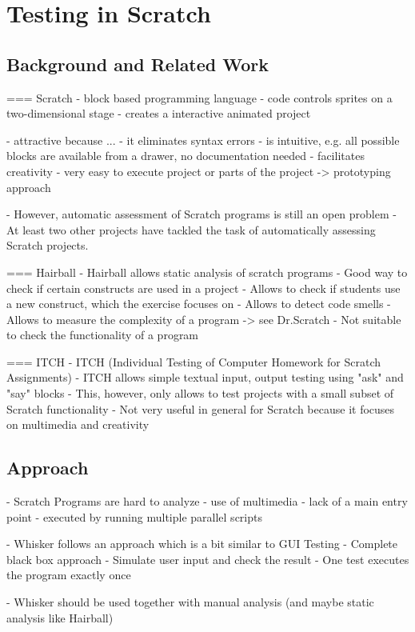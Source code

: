 \section{Testing in Scratch}

\subsection{Background and Related Work}

=== Scratch
- block based programming language
- code controls sprites on a two-dimensional stage
- creates a interactive animated project

- attractive because ...
    - it eliminates syntax errors
    - is intuitive, e.g. all possible blocks are available from a drawer, no documentation needed
    - facilitates creativity
    - very easy to execute project or parts of the project -> prototyping approach

- However, automatic assessment of Scratch programs is still an open problem
- At least two other projects have tackled the task of automatically assessing Scratch projects.

=== Hairball
- Hairball \cite{hairball} allows static analysis of scratch programs
- Good way to check if certain constructs are used in a project
    - Allows to check if students use a new construct, which the exercise focuses on
- Allows to detect code smells
- Allows to measure the complexity of a program -> see Dr.Scratch
- Not suitable to check the functionality of a program

=== ITCH
- ITCH (Individual Testing of Computer Homework for Scratch Assignments) \cite{itch}
- ITCH allows simple textual input, output testing using "ask" and "say" blocks
- This, however,  only allows to test projects with a small subset of Scratch functionality
- Not very useful in general for Scratch because it focuses on multimedia and creativity

\subsection{Approach}
- Scratch Programs are hard to analyze
    - use of multimedia
    - lack of a main entry point
    - executed by running multiple parallel scripts

- Whisker follows an approach which is a bit similar to GUI Testing
- Complete black box approach
- Simulate user input and check the result
- One test executes the program exactly once

- Whisker should be used together with manual analysis (and maybe static analysis like Hairball)
